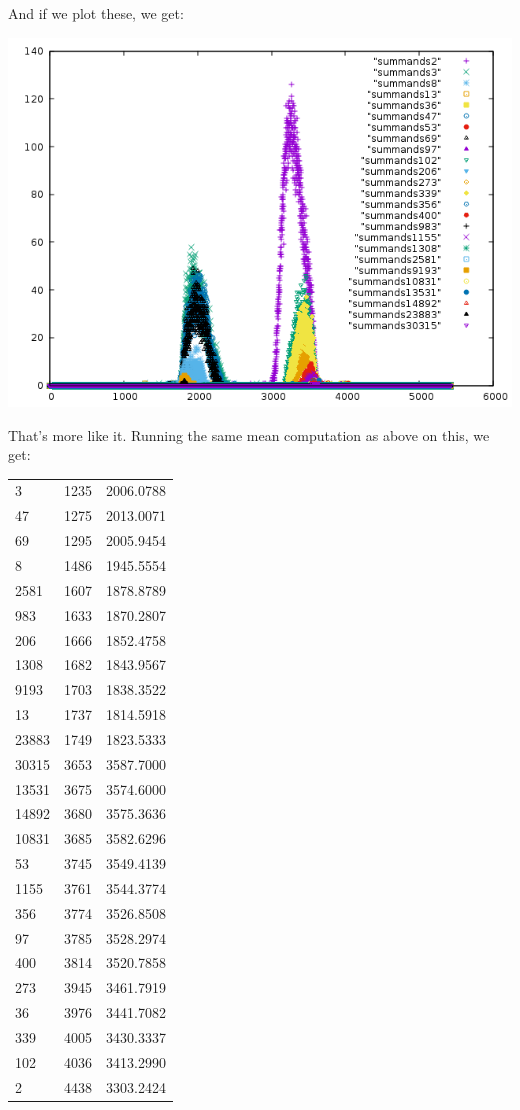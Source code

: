 \documentclass{article}
\theoremstyle{definition}
\theoremstyle{remark}
\numberwithin{equation}{section}
\begin{document}
And if we plot these, we get: 

\includegraphics[scale=0.5]{../figs/shifted_summands_mod_5422.png}

That's more like it.  Running the same mean computation as above on this, we get:

\begin{tabular}{lll}
3    		&1235	&2006.0788\\
47   		&1275	&2013.0071\\
69   		&1295	&2005.9454\\
8    		&1486	&1945.5554\\
2581 		&1607	&1878.8789\\
983  		&1633	&1870.2807\\
206  		&1666	&1852.4758\\
1308 		&1682	&1843.9567\\
9193 		&1703	&1838.3522\\
13   		&1737	&1814.5918\\
23883		&1749	&1823.5333\\
30315		&3653	&3587.7000\\
13531		&3675	&3574.6000\\
14892		&3680	&3575.3636\\
10831		&3685	&3582.6296\\
53  		&3745	&3549.4139\\
1155 		&3761	&3544.3774\\
356  		&3774	&3526.8508\\
97   		&3785	&3528.2974\\
400  		&3814	&3520.7858\\
273  		&3945	&3461.7919\\
36   		&3976	&3441.7082\\
339  		&4005	&3430.3337\\
102  		&4036	&3413.2990\\
2    		&4438	&3303.2424\\
\end{tabular}
\end{document}
